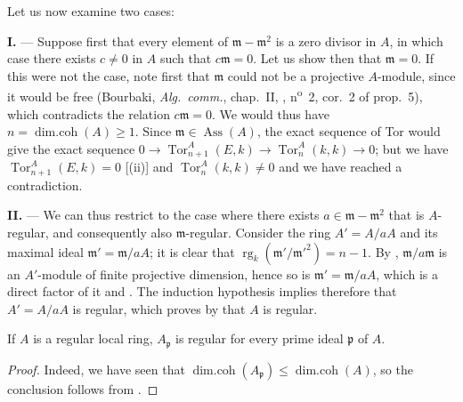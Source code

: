 Let us now examine two cases:

\medskip\noindent\textbf{I.} ---
Suppose first that every element of $\mathfrak{m}-\mathfrak{m}^2$ is a zero divisor in $A$, in which case  there exists $c\neq 0$ in $A$ such that $c\mathfrak{m}=0$.
Let us show then that $\mathfrak{m}=0$.
If this were not the case, note first that $\mathfrak{m}$ could not be a projective $A$-module, since it would be free (Bourbaki, \emph{Alg.~comm.}, chap.~II, , n\textsuperscript{o}~2, cor.~2 of prop.~5), which contradicts the relation $c\mathfrak{m}=0$.
We would thus have $n=\operatorname{dim.coh}(A)\geq 1$.
Since $\mathfrak{m}\in\operatorname{Ass}(A)$, the exact sequence of Tor would give the exact sequence $0\to\operatorname{Tor}^A_{n+1}(E,k)\to\operatorname{Tor}^A_n(k,k)\to 0$;
but we have $\operatorname{Tor}^A_{n+1}(E,k)=0$ [(ii)] and $\operatorname{Tor}^A_n(k,k)\neq 0$  and we have reached a contradiction.

\medskip\noindent\textbf{II.} ---
We can thus restrict to the case where there exists $a\in\mathfrak{m}-\mathfrak{m}^2$ that is $A$-regular, and consequently also $\mathfrak{m}$-regular.
Consider the ring $A'=A/aA$ and its maximal ideal $\mathfrak{m}'=\mathfrak{m}/aA$;
it is clear that $\operatorname{rg}_k(\mathfrak{m}'/\mathfrak{m}'^2)=n-1$.
By , $\mathfrak{m}/a\mathfrak{m}$ is an $A'$-module of finite projective dimension, hence so is $\mathfrak{m}'=\mathfrak{m}/aA$, which is a direct factor of it  and .
The induction hypothesis implies therefore that $A'=A/aA$ is regular, which proves by  that $A$ is regular.

\begin{corollary}[17.3.2]
\label{0.17.3.2}
If $A$ is a regular local ring, $A_\mathfrak{p}$ is regular for every prime ideal $\mathfrak{p}$ of $A$.
\end{corollary}

\begin{proof}
Indeed, we have seen  that $\operatorname{dim.coh}(A_\mathfrak{p})\leq\operatorname{dim.coh}(A)$, so the conclusion follows from .
\end{proof}

